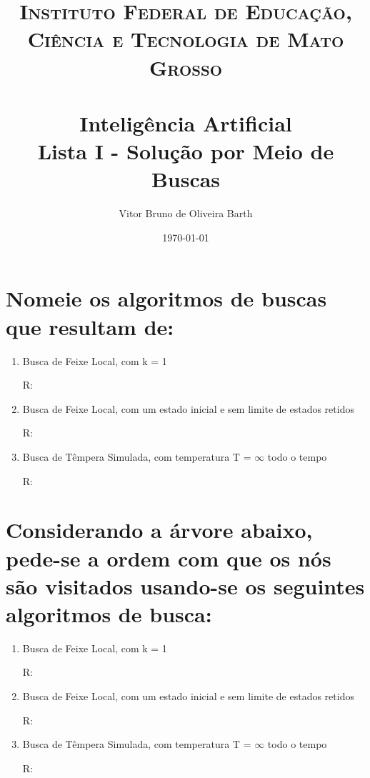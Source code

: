 \documentclass[tikz, paper=a4, fontsize=11pt]{scrartcl} %
\title{	
    \normalfont \normalsize 
    \textsc{Instituto Federal de Educação, Ciência e Tecnologia de Mato Grosso} \\ [25pt] %
    \horrule{0.5pt} \\[0.4cm] %
    \huge Inteligência Artificial \\ %
    \huge Lista I - Solução por Meio de Buscas
    \horrule{2pt} \\[0.5cm] %
    }
\author{Vitor Bruno de Oliveira Barth} %
\date{\normalsize\today} %
\numberwithin{equation}{section} %
\numberwithin{figure}{section} %
\numberwithin{table}{section} %
\begin{document}
    
    \maketitle
    
    
    \section{Nomeie os algoritmos de buscas que resultam de:}
    \begin{enumerate}
        \item Busca de Feixe Local, com k = 1 
        \par R: 

        \item Busca de Feixe Local, com um estado inicial e sem limite de estados retidos
        \par R:

        \item Busca de Têmpera Simulada, com temperatura T = $\infty$ todo o tempo
        \par R:
    \end{enumerate}

    
    \section{Considerando a árvore abaixo, pede-se a ordem com que os nós são visitados usando-se os seguintes algoritmos de busca:}
    \begin{enumerate}
        \item Busca de Feixe Local, com k = 1 
        \par R: 

        \item Busca de Feixe Local, com um estado inicial e sem limite de estados retidos
        \par R:

        \item Busca de Têmpera Simulada, com temperatura T = $\infty$ todo o tempo
        \par R:
    \end{enumerate}
    
    
\end{document}
